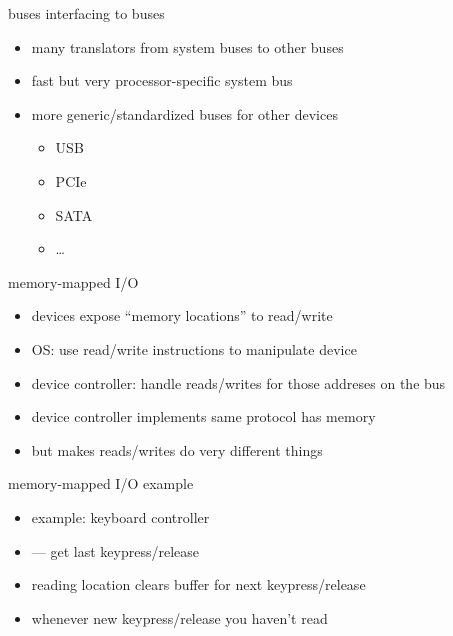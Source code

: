 


\begin{frame}{buses interfacing to buses}
    \begin{itemize}
    \item many translators from system buses to other buses
    \item fast but very processor-specific system bus
    \item more generic/standardized buses for other devices
        \begin{itemize}
        \item USB
        \item PCIe
        \item SATA
        \item \ldots
        \end{itemize}
    \end{itemize}
\end{frame}


\begin{frame}{memory-mapped I/O}
    \begin{itemize}
    \item devices expose ``memory locations'' to read/write
    \item OS: use read/write instructions to manipulate device
    \item device controller: handle reads/writes for those addreses on the bus
    \vspace{.5cm}
    \item device controller implements same protocol has memory
    \item but makes reads/writes do very different things
    \end{itemize}
\end{frame}

\begin{frame}{memory-mapped I/O example}
    \begin{itemize}
    \item example: keyboard controller
    \item {} --- get last keypress/release
    \item reading location clears buffer for next keypress/release
    \item {} whenever new keypress/release you haven't read
    \end{itemize}
\end{frame}


